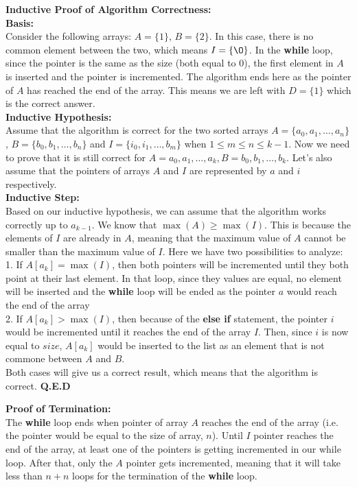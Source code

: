     \textbf{Inductive Proof of Algorithm Correctness:} \\
    \textbf{Basis:} \\
    Consider the following arrays: $A=\{1\}$, $B=\{2\}$. In this case, there is no common element between the two, which means $I=\{ \O \}$.
    In the \textbf{while} loop, since the pointer is the same as the size (both equal to 0), the first element in $A$ is inserted and the pointer is incremented. 
    The algorithm ends here as the pointer of $A$ has reached the end of the array. This means we are left with $D=\{1\}$ which is the correct answer. \\
    \textbf{Inductive Hypothesis:} \\
    Assume that the algorithm is correct for the two sorted arrays $A=\{a_0, a_1, \ldots, a_n\}$, $B=\{b_0, b_1, \ldots, b_n\}$ and $I=\{i_0, i_1, \ldots, b_m\}$ when $1 \leq m \leq n \leq k-1$.
    Now we need to prove that it is still correct for $A={a_0, a_1, \ldots, a_k}, B={b_0, b_1, \ldots, b_k}$. Let's also assume that the pointers
    of arrays $A$ and $I$ are represented by $a$ and $i$ respectively. \\ 
    \textbf{Inductive Step:} \\
    Based on our inductive hypothesis, we can assume that the algorithm works correctly up to $a_{k-1}$. We know that $\max(A) \geq \max(I)$. This is because the elements of $I$ are already in $A$, meaning that the maximum value of $A$ cannot be smaller than
    the maximum value of $I$. Here we have two possibilities to analyze: \\
    1. If $A[a_k] = \max(I)$, then both pointers will be incremented until they both point at their last element. In that loop, since they values are equal,
    no element will be inserted and the \textbf{while} loop will be ended as the pointer $a$ would reach the end of the array \\
    2. If $A[a_k] > \max(I)$, then because of the \textbf{else if} statement, the pointer $i$ would be incremented until it reaches the end of the array $I$. Then, since $i$ is now equal to $size$, $A[a_k]$ would be
    inserted to the list as an element that is not commone between $A$ and $B$. \\
    Both cases will give us a correct result, which means that the algorithm is correct.
    \textbf{Q.E.D}

    \textbf{Proof of Termination:} \\
    The \textbf{while} loop ends when pointer of array $A$ reaches the end of the array (i.e. the pointer would be equal to the size of array, $n$). Until $I$ pointer reaches the end of the array, at least one of the pointers is
    getting incremented in our while loop. After that, only the $A$ pointer gets incremented, meaning that it will take less than $n+n$ loops for the termination of the \textbf{while} loop.